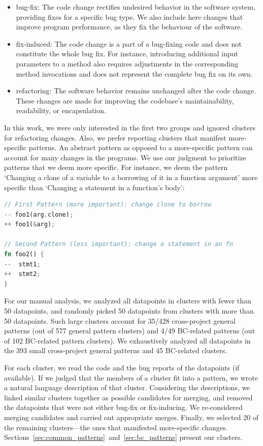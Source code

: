 \begin{itemize}
    \item bug-fix: The code change rectifies undesired behavior in the software system, providing fixes for a specific bug type. We also include here changes that improve program performance, as they fix the behaviour of the software.

    \item fix-induced: The code change is a part of a bug-fixing code and does not constitute the whole bug fix. For instance, introducing additional input parameters to a method also requires adjustments in the corresponding method invocations and does not represent the complete bug fix on its own.
    
    \item refactoring: The software behavior remains unchanged after the code change. These changes are made for improving the codebase's maintainability, readability, or encapsulation.
\end{itemize}

In this work, we were only interested in the first two groups and ignored clusters for refactoring changes. Also, we prefer reporting clusters that manifest more-specific patterns. An abstract pattern as opposed to a more-specific pattern can account for many changes in the programs. We use our judgment to prioritize patterns that we deem more specific. For instance, we deem the pattern `Changing a clone of a variable to a borrowing of it in a function argument' more specific than `Changing a statement in a function's body':

\begin{lstlisting}[language=Rust, style=colouredRust]
// First Pattern (more important): change clone to borrow
-- foo1(arg.clone);
++ foo1(&arg);

// Second Pattern (less important): change a statement in an fn
fn foo2() {
--  stmt1;
++  stmt2;
}

\end{lstlisting}


For our manual analysis, we analyzed all datapoints in clusters with fewer than 50 datapoints, and randomly picked 50 datapoints from clusters with more than 50 datapoints. Such large clusters account for 35/428 cross-project general patterns (out of 577 general pattern clusters) and 4/49 BC-related patterns (out of 102 BC-related pattern clusters). We exhaustively analyzed all datapoints in the 393 small cross-project general patterns and 45 BC-related clusters.

For each cluster, we read the code and the bug reports of the datapoints (if available). If we judged that the members of a cluster fit into a pattern, we wrote a natural language description of that cluster. Considering the descriptions, we linked similar clusters together as possible candidates for merging, and removed the datapoints that were not either bug-fix or fix-inducing. We re-considered merging candidates and carried out appropriate merges. Finally, we selected 20 of the remaining clusters---the ones that manifested more-specific changes. Sections~\ref{sec:common_patterns}~and~\ref{sec:bc_patterns} present our clusters.

